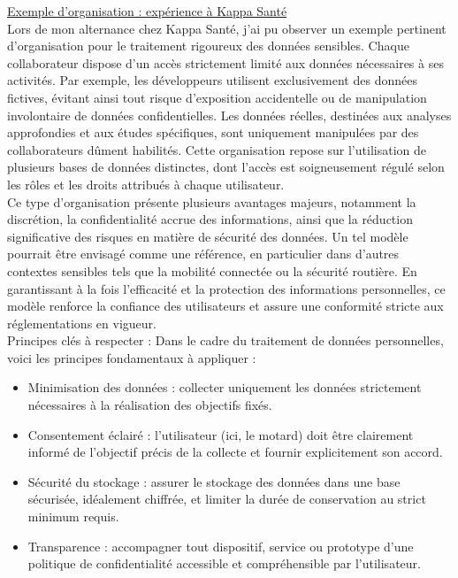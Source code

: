 \vspace{0.5cm}
\underline{Exemple d’organisation : expérience à Kappa Santé}\\
Lors de mon alternance chez Kappa Santé, j'ai pu observer un exemple pertinent d'organisation pour le traitement rigoureux des données sensibles. Chaque collaborateur dispose d'un accès strictement limité aux données nécessaires à ses activités. Par exemple, les développeurs utilisent exclusivement des données fictives, évitant ainsi tout risque d'exposition accidentelle ou de manipulation involontaire de données confidentielles.
Les données réelles, destinées aux analyses approfondies et aux études spécifiques, sont uniquement manipulées par des collaborateurs dûment habilités. Cette organisation repose sur l'utilisation de plusieurs bases de données distinctes, dont l'accès est soigneusement régulé selon les rôles et les droits attribués à chaque utilisateur.\\
Ce type d'organisation présente plusieurs avantages majeurs, notamment la discrétion, la confidentialité accrue des informations, ainsi que la réduction significative des risques en matière de sécurité des données. Un tel modèle pourrait être envisagé comme une référence, en particulier dans d'autres contextes sensibles tels que la mobilité connectée ou la sécurité routière. En garantissant à la fois l'efficacité et la protection des informations personnelles, ce modèle renforce la confiance des utilisateurs et assure une conformité stricte aux réglementations en vigueur.\\

Principes clés à respecter :
Dans le cadre du traitement de données personnelles, voici les principes fondamentaux à appliquer :
\begin{itemize}
\item Minimisation des données : collecter uniquement les données strictement nécessaires à la réalisation des objectifs fixés.
\item Consentement éclairé : l'utilisateur (ici, le motard) doit être clairement informé de l'objectif précis de la collecte et fournir explicitement son accord.
\item Sécurité du stockage : assurer le stockage des données dans une base sécurisée, idéalement chiffrée, et limiter la durée de conservation au strict minimum requis.
\item Transparence : accompagner tout dispositif, service ou prototype d'une politique de confidentialité accessible et compréhensible par l'utilisateur.
\end{itemize}

